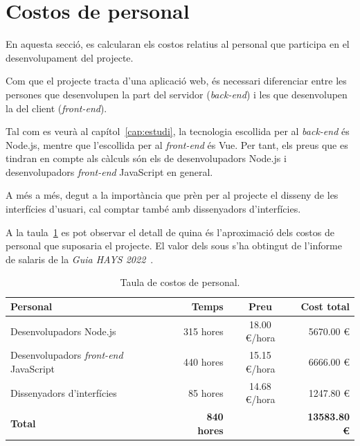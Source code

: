 \documentclass[a4paper,12pt]{ThesisStyle}
\begin{document}
\section{Costos de personal}
\label{sec:costos_personal}

En aquesta secció, es calcularan els costos relatius al personal que participa en el desenvolupament del projecte.

Com que el projecte tracta d'una aplicació web, és necessari diferenciar entre les persones que desenvolupen la part del servidor (\textit{back-end}) i les que desenvolupen la del client (\textit{front-end}).

Tal com es veurà al capítol~\ref{cap:estudi}, la tecnologia escollida per al \textit{back-end} és Node.js, mentre que l'escollida per al \textit{front-end} és Vue. Per tant, els preus que es tindran en compte als càlculs són els de desenvolupadors Node.js i desenvolupadors \textit{front-end} JavaScript en general.

A més a més, degut a la importància que prèn per al projecte el disseny de les interfícies d'usuari, cal comptar també amb dissenyadors d'interfícies.

A la taula~\ref{taula:costos_personal} es pot observar el detall de quina és l'aproximació dels costos de personal que suposaria el projecte. El valor dels sous s'ha obtingut de l'informe de salaris de la \emph{Guia HAYS 2022}~\cite{Hays}.

\begin{table}[H]
  \begin{tabularx}{\textwidth}{X  r  c  r}
    \toprule
    \rowcolor{TblDef}
    \textbf{Personal}                               & \textbf{Temps}      & \textbf{Preu}   & \textbf{Cost total} \\
    \midrule[0.9pt]
    Desenvolupadors Node.js                         & 315 hores           & 18.00 €/hora    & 5670.00 € \\
    \midrule
    Desenvolupadors \textit{front-end} JavaScript   & 440 hores           & 15.15 €/hora    & 6666.00 € \\
    \midrule
    Dissenyadors d'interfícies                      & 85 hores            & 14.68 €/hora    & 1247.80 € \\
    \midrule[0.9pt]
    \textbf{Total}                                  & \textbf{840 hores}  &                 & \textbf{13583.80 €} \\
    \bottomrule
  \end{tabularx}
  \caption{\label{taula:costos_personal} Taula de costos de personal.}
\end{table}
\end{document}
